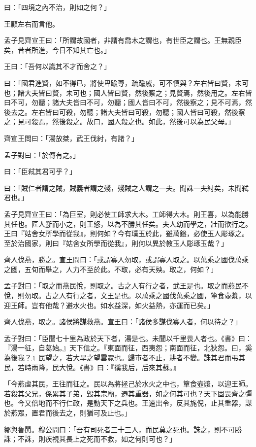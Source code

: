 \documentclass[12pt,a4paper]{ctexbook}
\begin{document}
曰：「四境之內不治，則如之何？」\par
王顧左右而言他。\par
孟子見齊宣王曰：「所謂故國者，非謂有喬木之謂也，有世臣之謂也。王無親臣矣，昔者所進，今日不知其亡也。」\par
王曰：「吾何以識其不才而舍之？」\par
曰：「國君進賢，如不得已，將使卑踰尊，疏踰戚，可不慎與？左右皆曰賢，未可也；諸大夫皆曰賢，未可也；國人皆曰賢，然後察之；見賢焉，然後用之。左右皆曰不可，勿聽；諸大夫皆曰不可，勿聽；國人皆曰不可，然後察之；見不可焉，然後去之。左右皆曰可殺，勿聽；諸大夫皆曰可殺，勿聽；國人皆曰可殺，然後察之；見可殺焉，然後殺之。故曰，國人殺之也。如此，然後可以為民父母。」\par
齊宣王問曰：「湯放桀，武王伐紂，有諸？」\par
孟子對曰：「於傳有之。」\par
曰：「臣弒其君可乎？」\par
曰：「賊仁者謂之賊，賊義者謂之殘，殘賊之人謂之一夫。聞誅一夫紂矣，未聞弒君也。」\par
孟子見齊宣王曰：「為巨室，則必使工師求大木。工師得大木。則王喜，以為能勝其任也。匠人斵而小之，則王怒，以為不勝其任矣。夫人幼而學之，壯而欲行之。王曰『姑舍女所學而從我』，則何如？今有璞玉於此，雖萬鎰，必使玉人彫琢之。至於治國家，則曰『姑舍女所學而從我』，則何以異於教玉人彫琢玉哉？」\par
齊人伐燕，勝之。宣王問曰：「或謂寡人勿取，或謂寡人取之。以萬乘之國伐萬乘之國，五旬而舉之，人力不至於此。不取，必有天殃。取之，何如？」\par
孟子對曰：「取之而燕民悅，則取之。古之人有行之者，武王是也。取之而燕民不悅，則勿取。古之人有行之者，文王是也。以萬乘之國伐萬乘之國，簞食壺漿，以迎王師。豈有他哉？避水火也。如水益深，如火益熱，亦運而已矣。」\par
齊人伐燕，取之。諸侯將謀救燕。宣王曰：「諸侯多謀伐寡人者，何以待之？」\par
孟子對曰：「臣聞七十里為政於天下者，湯是也。未聞以千里畏人者也。《書》曰：『湯一征，自葛始。』天下信之。『東面而征，西夷怨；南面而征，北狄怨。曰，奚為後我？』民望之，若大旱之望雲霓也。歸市者不止，耕者不變。誅其君而弔其民，若時雨降，民大悅。《書》曰：『徯我后，后來其蘇。』\par
「今燕虐其民，王往而征之。民以為將拯己於水火之中也，簞食壺漿，以迎王師。若殺其父兄，係累其子弟，毀其宗廟，遷其重器，如之何其可也？天下固畏齊之彊也。今又倍地而不行仁政，是動天下之兵也。王速出令，反其旄倪，止其重器，謀於燕眾，置君而後去之，則猶可及止也。」\par
鄒與魯鬨。穆公問曰：「吾有司死者三十三人，而民莫之死也。誅之，則不可勝誅；不誅，則疾視其長上之死而不救，如之何則可也？」\par
\end{document}
